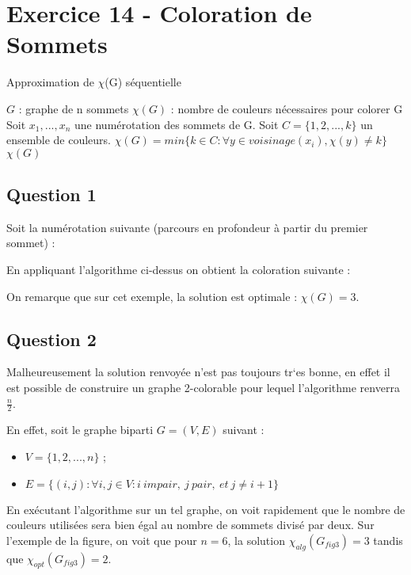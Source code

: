 
\section{Exercice 14 - Coloration de Sommets}\label{ex14}

\begin{center}
\begin{algorithm}[H]
\caption{Approximation de $\chi$(G) s\'equentielle}\label{ex14_algo}
\begin{algorithmic}[1]
\REQUIRE $G$ : graphe de n sommets
\ENSURE $\chi(G)$ : nombre de couleurs n\'ecessaires pour colorer G
\STATE Soit $x_1,...,x_n$ une num\'erotation des sommets de G.
\STATE Soit $C = \{1,2,...,k\}$ un ensemble de couleurs.
	\STATE $\chi(G) = min\{k \in C : \forall y \in voisinage(x_i), \chi(y) \neq k\}$
\ENDFOR
\RETURN $\chi(G)$
\end{algorithmic}
\end{algorithm}
\end{center}

\subsection{Question 1}\label{ex14_q1}
Soit la num\'erotation suivante (parcours en profondeur \`a partir du premier sommet) :


En appliquant l'algorithme ci-dessus on obtient la coloration suivante :

On remarque que sur cet exemple, la solution est optimale : $\chi(G) = 3$.

\subsection{Question 2}\label{ex14_q2}
Malheureusement la solution renvoy\'ee n'est pas toujours tr`es bonne, en effet il est
possible de construire un graphe 2-colorable pour lequel l'algorithme renverra
$\frac{n}{2}$.

En effet, soit le graphe biparti $G = (V,E)$ suivant :\\
\begin{itemize}
	\item $V = \{1,2,...,n\}$ ;
	\item $E = \{(i,j) : \forall i,j \in V : i\ impair,\ j\ pair,\ et\ j \neq i+1\}$\\
\end{itemize}


En ex\'ecutant l'algorithme sur un tel graphe, on voit rapidement que le nombre de
couleurs utilis\'ees sera bien \'egal au nombre de sommets divis\'e par deux.
Sur l'exemple de la figure, on voit que pour $n = 6$, la solution $\chi_{alg}(G_{fig3}) =
3$ tandis que $\chi_{opt}(G_{fig3}) = 2$.





